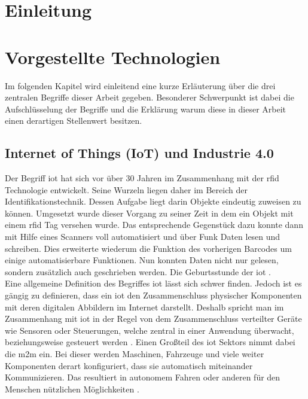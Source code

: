 \section{Einleitung}
\label{s:intro}

\section{Vorgestellte Technologien}
\label{s:grundlagen}

Im folgenden Kapitel wird einleitend eine kurze Erläuterung über die drei zentralen Begriffe dieser Arbeit gegeben. Besonderer Schwerpunkt ist dabei die Aufschlüsselung der Begriffe und die Erklärung warum diese in dieser Arbeit einen derartigen Stellenwert besitzen.\\ 

\subsection{Internet of Things (IoT) und Industrie 4.0}
\label{ss:grundlagen:iot}

\noindent Der Begriff \ac{iot} hat sich vor über 30 Jahren im Zusammenhang mit der \ac{rfid} Technologie entwickelt. Seine Wurzeln liegen daher im Bereich der Identifikationstechnik. Dessen Aufgabe liegt darin Objekte eindeutig zuweisen zu können. Umgesetzt wurde dieser Vorgang zu seiner Zeit in dem ein Objekt mit einem \ac{rfid} Tag versehen wurde. Das entsprechende Gegenstück dazu konnte dann mit Hilfe eines Scanners voll automatisiert und über Funk Daten lesen und schreiben. Dies erweiterte wiederum die Funktion des vorherigen Barcodes um einige automatisierbare Funktionen. Nun konnten Daten nicht nur gelesen, sondern zusätzlich auch geschrieben werden. Die Geburtsstunde der \ac{iot} \cite[Seite 37]{Holtschulte20:IOS}.\\

\noindent Eine allgemeine Definition des Begriffes \ac{iot} lässt sich schwer finden. Jedoch ist es gängig zu definieren, dass ein \ac{iot} den Zusammenschluss physischer Komponenten mit deren digitalen Abbildern im Internet darstellt. Deshalb spricht man im Zusammenhang mit \ac{iot} in der Regel von dem Zusammenschluss verteilter Geräte wie Sensoren oder Steuerungen, welche zentral in einer Anwendung überwacht, beziehungsweise gesteuert werden \cite[Seite 33]{Holtschulte20:IOS}. Einen Großteil des \ac{iot} Sektors nimmt dabei die \ac{m2m} ein. Bei dieser werden Maschinen, Fahrzeuge und viele weiter Komponenten derart konfiguriert, dass sie automatisch miteinander Kommunizieren. Das resultiert in autonomem Fahren oder anderen für den Menschen nützlichen Möglichkeiten \cite[Seite 449]{Holtschulte20:IOS}.\\

